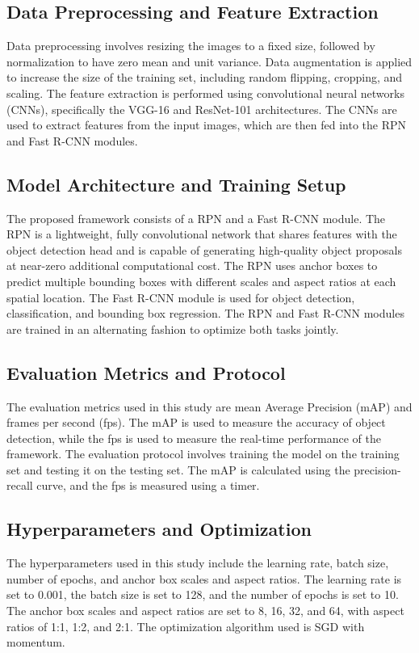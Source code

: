 \documentclass{article}
\begin{document}
\subsection{Data Preprocessing and Feature Extraction}
Data preprocessing involves resizing the images to a fixed size, followed by normalization to have zero mean and unit variance. Data augmentation is applied to increase the size of the training set, including random flipping, cropping, and scaling. The feature extraction is performed using convolutional neural networks (CNNs), specifically the VGG-16 and ResNet-101 architectures. The CNNs are used to extract features from the input images, which are then fed into the RPN and Fast R-CNN modules.

\subsection{Model Architecture and Training Setup}
The proposed framework consists of a RPN and a Fast R-CNN module. The RPN is a lightweight, fully convolutional network that shares features with the object detection head and is capable of generating high-quality object proposals at near-zero additional computational cost. The RPN uses anchor boxes to predict multiple bounding boxes with different scales and aspect ratios at each spatial location. The Fast R-CNN module is used for object detection, classification, and bounding box regression. The RPN and Fast R-CNN modules are trained in an alternating fashion to optimize both tasks jointly.

\subsection{Evaluation Metrics and Protocol}
The evaluation metrics used in this study are mean Average Precision (mAP) and frames per second (fps). The mAP is used to measure the accuracy of object detection, while the fps is used to measure the real-time performance of the framework. The evaluation protocol involves training the model on the training set and testing it on the testing set. The mAP is calculated using the precision-recall curve, and the fps is measured using a timer.

\subsection{Hyperparameters and Optimization}
The hyperparameters used in this study include the learning rate, batch size, number of epochs, and anchor box scales and aspect ratios. The learning rate is set to 0.001, the batch size is set to 128, and the number of epochs is set to 10. The anchor box scales and aspect ratios are set to 8, 16, 32, and 64, with aspect ratios of 1:1, 1:2, and 2:1. The optimization algorithm used is SGD with momentum.
\end{document}
